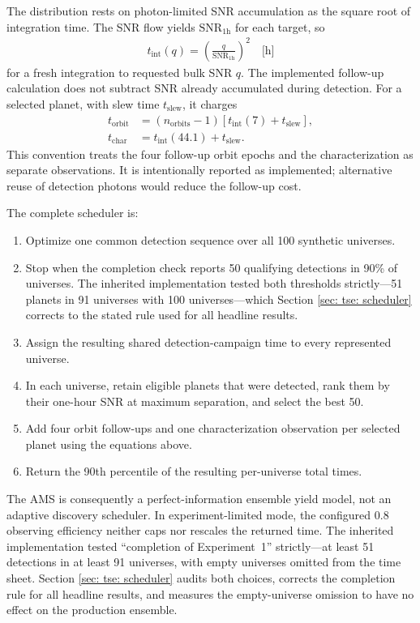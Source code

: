 \documentclass[12pt,a4paper]{article}
\numberwithin{equation}{section}
\numberwithin{figure}{section}
\numberwithin{table}{section}
\begin{document}
The distribution rests on photon-limited SNR accumulation as the square root of integration time. The SNR flow yields $\text{SNR}_{1\text{h}}$ for each target, so
\begin{align} \label{eq: integration time}
    t_\mathrm{int}(q) = \left(\frac{q}{\text{SNR}_{1\text{h}}}\right)^2\quad\text{[h]}
\end{align}
for a fresh integration to requested bulk SNR $q$. The implemented follow-up calculation does not subtract SNR already accumulated during detection. For a selected planet, with slew time $t_\mathrm{slew}$, it charges
\begin{align}
t_\mathrm{orbit}&=(n_\mathrm{orbits}-1)
\left[t_\mathrm{int}(7)+t_\mathrm{slew}\right],\\
t_\mathrm{char}&=t_\mathrm{int}(44.1)+t_\mathrm{slew}.
\end{align}
This convention treats the four follow-up orbit epochs and the characterization as separate observations. It is intentionally reported as implemented; alternative reuse of detection photons would reduce the follow-up cost.

The complete scheduler is:
\begin{enumerate}
    \item Optimize one common detection sequence over all 100 synthetic universes.
    \item Stop when the completion check reports 50 qualifying detections in 90\% of universes. The inherited implementation tested both thresholds strictly---51 planets in 91 universes with 100 universes---which Section \ref{sec: tse: scheduler} corrects to the stated rule used for all headline results.
    \item Assign the resulting shared detection-campaign time to every represented universe.
    \item In each universe, retain eligible planets that were detected, rank them by their one-hour SNR at maximum separation, and select the best 50.
    \item Add four orbit follow-ups and one characterization observation per selected planet using the equations above.
    \item Return the 90th percentile of the resulting per-universe total times.
\end{enumerate}

The AMS is consequently a perfect-information ensemble yield model, not an adaptive discovery scheduler. In experiment-limited mode, the configured 0.8 observing efficiency neither caps nor rescales the returned time. The inherited implementation tested ``completion of Experiment~1'' strictly---at least 51 detections in at least 91 universes, with empty universes omitted from the time sheet. Section \ref{sec: tse: scheduler} audits both choices, corrects the completion rule for all headline results, and measures the empty-universe omission to have no effect on the production ensemble.
\end{document}
